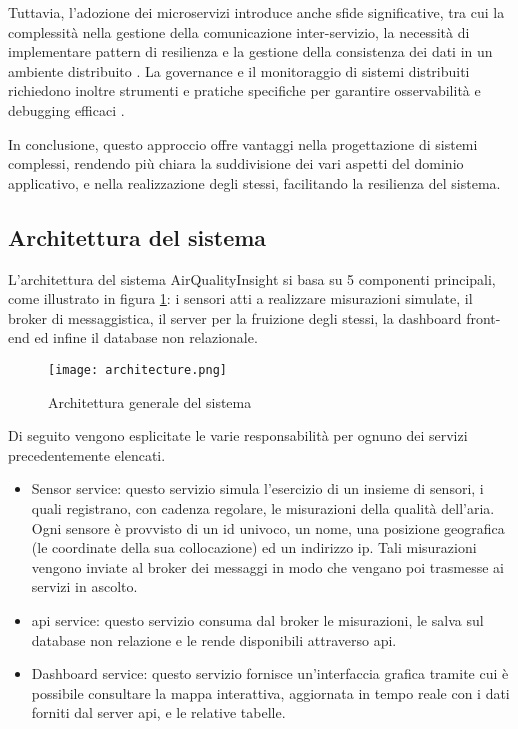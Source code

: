 Tuttavia, l'adozione dei microservizi introduce anche sfide significative, tra cui la complessità nella gestione
della comunicazione inter-servizio, la necessità di implementare pattern di resilienza e la gestione della consistenza
dei dati in un ambiente distribuito \cite{richardson2018microservices}. La governance e il monitoraggio
di sistemi distribuiti richiedono inoltre strumenti e pratiche specifiche
per garantire osservabilità e debugging efficaci \cite{wolff2016microservices}.

In conclusione, questo approccio offre vantaggi nella progettazione di sistemi complessi, rendendo più chiara
la suddivisione dei vari aspetti del dominio applicativo, e nella realizzazione degli stessi,
facilitando la resilienza del sistema.

\subsection{Architettura del sistema}

L'architettura del sistema AirQualityInsight si basa su 5 componenti principali, come illustrato
in figura \ref{fig:architecture}: i sensori atti a realizzare misurazioni simulate, il broker di messaggistica,
il server per la fruizione degli stessi, la dashboard front-end ed infine il database non relazionale.

\begin{figure}[H]
  \centering
  \texttt{[image: architecture.png]}
  \caption{Architettura generale del sistema}
  \label{fig:architecture}
\end{figure}

Di seguito vengono esplicitate le varie responsabilità per ognuno dei servizi precedentemente elencati.

\begin{itemize}
  \item Sensor service: questo servizio simula l'esercizio di un insieme di sensori, i quali registrano,
        con cadenza regolare, le misurazioni della qualità dell'aria. Ogni sensore è provvisto di un id univoco,
        un nome, una posizione geografica (le coordinate della sua collocazione) ed un indirizzo \acrshort{ip}.
        Tali misurazioni vengono inviate al broker dei messaggi in modo che vengano poi trasmesse ai servizi in ascolto.
  \item \acrshort{api} service: questo servizio consuma dal broker le misurazioni, le salva
        sul database non relazione e le rende disponibili attraverso \acrshort{api}.
  \item Dashboard service: questo servizio fornisce un'interfaccia grafica tramite cui è possibile consultare
        la mappa interattiva, aggiornata in tempo reale con i dati forniti dal server \acrshort{api}, e le relative
        tabelle.
\end{itemize}

